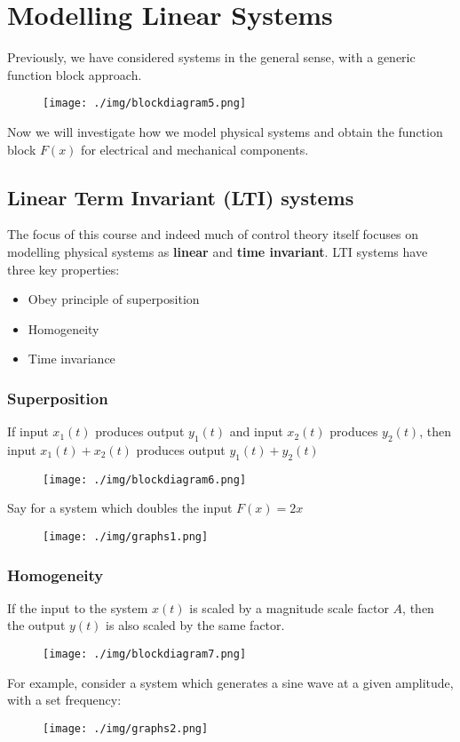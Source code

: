 \chapter{Modelling Linear Systems}
Previously, we have considered systems in the general sense, with a generic function block approach.
\begin{figure}[H]
  \centering
  \texttt{[image: ./img/blockdiagram5.png]}
\end{figure}
Now we will investigate how we model physical systems and obtain the function block $F(x)$ for electrical and mechanical components.
\section{Linear Term Invariant (LTI) systems}
The focus of this course and indeed much of control theory itself focuses on modelling physical systems as \textbf{linear} and \textbf{time invariant}. LTI systems have three key properties:
\begin{itemize}
  \item Obey principle of superposition
  \item Homogeneity
  \item Time invariance
\end{itemize}
\subsection{Superposition}
If input $x_1(t)$ produces output $y_1(t)$ and input $x_2(t)$ produces $y_2(t)$, then input $x_1(t) + x_2(t)$ produces output $y_1(t) + y_2(t)$
\begin{figure}[H]
  \centering
  \texttt{[image: ./img/blockdiagram6.png]}
\end{figure}
Say for a system which doubles the input $F(x) = 2x$
\begin{figure}[H]
  \centering
  \texttt{[image: ./img/graphs1.png]}
\end{figure}
\subsection{Homogeneity}
If the input to the system $x(t)$ is scaled by a magnitude scale factor $A$, then the output $y(t)$ is also scaled by the same factor.
\begin{figure}[H]
  \centering
  \texttt{[image: ./img/blockdiagram7.png]}
\end{figure}
For example, consider a system which generates a sine wave at a given amplitude, with a set frequency:
\begin{figure}[H]
  \centering
  \texttt{[image: ./img/graphs2.png]}
\end{figure}
